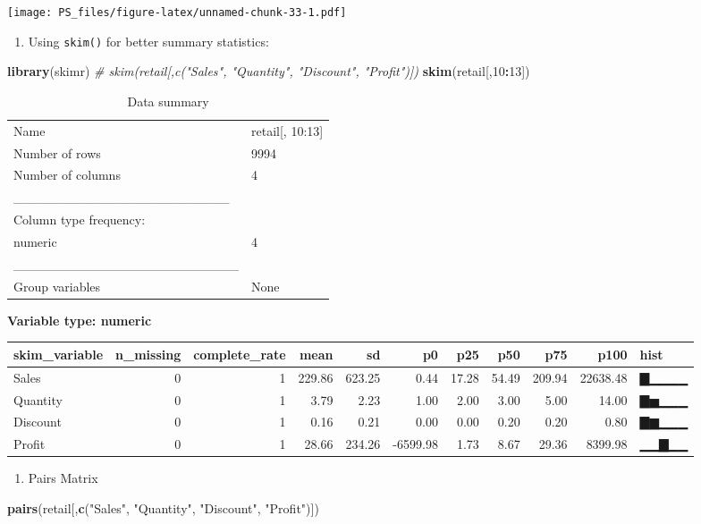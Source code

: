 \documentclass[]{article}
\newenvironment{Shaded}{\begin{snugshade}}{\end{snugshade}}
\newcommand{\CommentTok}[1]{\textcolor[rgb]{0.56,0.35,0.01}{\textit{#1}}}
\newcommand{\DecValTok}[1]{\textcolor[rgb]{0.00,0.00,0.81}{#1}}
\newcommand{\KeywordTok}[1]{\textcolor[rgb]{0.13,0.29,0.53}{\textbf{#1}}}
\newcommand{\NormalTok}[1]{#1}
\newcommand{\OperatorTok}[1]{\textcolor[rgb]{0.81,0.36,0.00}{\textbf{#1}}}
\newcommand{\StringTok}[1]{\textcolor[rgb]{0.31,0.60,0.02}{#1}}
\providecommand{\tightlist}{%
  \setlength{\itemsep}{0pt}\setlength{\parskip}{0pt}}
\begin{document}
\texttt{[image: PS\_files/figure-latex/unnamed-chunk-33-1.pdf]}

\begin{enumerate}
\def\labelenumi{\arabic{enumi}.}
\setcounter{enumi}{2}
\tightlist
\item
  Using \texttt{skim()} for better summary statistics:
\end{enumerate}

\begin{Shaded}
\begin{Highlighting}[]
\KeywordTok{library}\NormalTok{(skimr)}
\CommentTok{# skim(retail[,c("Sales", "Quantity", "Discount", "Profit")])}
\KeywordTok{skim}\NormalTok{(retail[,}\DecValTok{10}\OperatorTok{:}\DecValTok{13}\NormalTok{])}
\end{Highlighting}
\end{Shaded}

\begin{longtable}[]{@{}ll@{}}
\caption{Data summary}\tabularnewline
\toprule
\endhead
Name & retail{[}, 10:13{]}\tabularnewline
Number of rows & 9994\tabularnewline
Number of columns & 4\tabularnewline
\_\_\_\_\_\_\_\_\_\_\_\_\_\_\_\_\_\_\_\_\_\_\_ &\tabularnewline
Column type frequency: &\tabularnewline
numeric & 4\tabularnewline
\_\_\_\_\_\_\_\_\_\_\_\_\_\_\_\_\_\_\_\_\_\_\_\_ &\tabularnewline
Group variables & None\tabularnewline
\bottomrule
\end{longtable}

\textbf{Variable type: numeric}

\begin{longtable}[]{@{}lrrrrrrrrrl@{}}
\toprule
skim\_variable & n\_missing & complete\_rate & mean & sd & p0 & p25 &
p50 & p75 & p100 & hist\tabularnewline
\midrule
\endhead
Sales & 0 & 1 & 229.86 & 623.25 & 0.44 & 17.28 & 54.49 & 209.94 &
22638.48 & ▇▁▁▁▁\tabularnewline
Quantity & 0 & 1 & 3.79 & 2.23 & 1.00 & 2.00 & 3.00 & 5.00 & 14.00 &
▇▅▁▁▁\tabularnewline
Discount & 0 & 1 & 0.16 & 0.21 & 0.00 & 0.00 & 0.20 & 0.20 & 0.80 &
▇▆▁▁▁\tabularnewline
Profit & 0 & 1 & 28.66 & 234.26 & -6599.98 & 1.73 & 8.67 & 29.36 &
8399.98 & ▁▁▇▁▁\tabularnewline
\bottomrule
\end{longtable}

\begin{enumerate}
\def\labelenumi{\arabic{enumi}.}
\setcounter{enumi}{3}
\tightlist
\item
  Pairs Matrix
\end{enumerate}

\begin{Shaded}
\begin{Highlighting}[]
\KeywordTok{pairs}\NormalTok{(retail[,}\KeywordTok{c}\NormalTok{(}\StringTok{"Sales"}\NormalTok{, }\StringTok{"Quantity"}\NormalTok{, }\StringTok{"Discount"}\NormalTok{, }\StringTok{"Profit"}\NormalTok{)])}
\end{Highlighting}
\end{Shaded}
\end{document}
